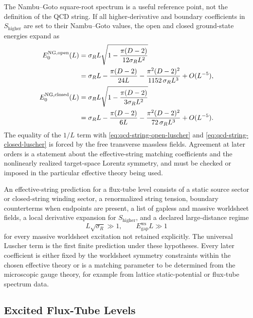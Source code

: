 The Nambu--Goto square-root spectrum is a useful reference point, not the
definition of the QCD string.  If all higher-derivative and boundary
coefficients in \(S_{\mathrm{higher}}\) are set to their Nambu--Goto values,
the open and closed ground-state energies expand as
\begin{align}
  E^{\mathrm{NG,open}}_0(L)
  &=
  \sigma_R L
  \sqrt{1-\frac{\pi(D-2)}{12\sigma_RL^2}}
  \notag\\
  &=
  \sigma_R L
  -\frac{\pi(D-2)}{24L}
  -\frac{\pi^2(D-2)^2}{1152\,\sigma_RL^3}
  +O(L^{-5}),
  \label{eq:qcd-string-ng-open-expansion}\\
  E^{\mathrm{NG,closed}}_0(L)
  &=
  \sigma_R L
  \sqrt{1-\frac{\pi(D-2)}{3\sigma_RL^2}}
  \notag\\
  &=
  \sigma_R L
  -\frac{\pi(D-2)}{6L}
  -\frac{\pi^2(D-2)^2}{72\,\sigma_RL^3}
  +O(L^{-5}).
  \label{eq:qcd-string-ng-closed-expansion}
\end{align}
The equality of the \(1/L\) term with
\eqref{eq:qcd-string-open-luscher} and
\eqref{eq:qcd-string-closed-luscher} is forced by the free transverse
massless fields.  Agreement at later orders is a statement about the
effective-string matching coefficients and the nonlinearly realized
target-space Lorentz symmetry, and must be checked or imposed in the
particular effective theory being used.

\begin{controlledapproximation}
\label{ca:qcd-effective-string-expansion}
An effective-string prediction for a flux-tube level consists of a static
source sector or closed-string winding sector, a renormalized string tension,
boundary counterterms when endpoints are present, a list of gapless and
massive worldsheet fields, a local derivative expansion for
\(S_{\mathrm{higher}}\), and a declared large-distance regime
\[
  L\sqrt{\sigma_R}\gg1,
  \qquad
  E_{\mathrm{gap}}^{\mathrm{ws}}L\gg1
\]
for every massive worldsheet excitation not retained explicitly.  The
universal Luscher term is the first finite prediction under these hypotheses.
Every later coefficient is either fixed by the worldsheet symmetry constraints
within the chosen effective theory or is a matching parameter to be determined
from the microscopic gauge theory, for example from lattice static-potential
or flux-tube spectrum data.
\end{controlledapproximation}

\subsection{Excited Flux-Tube Levels}

